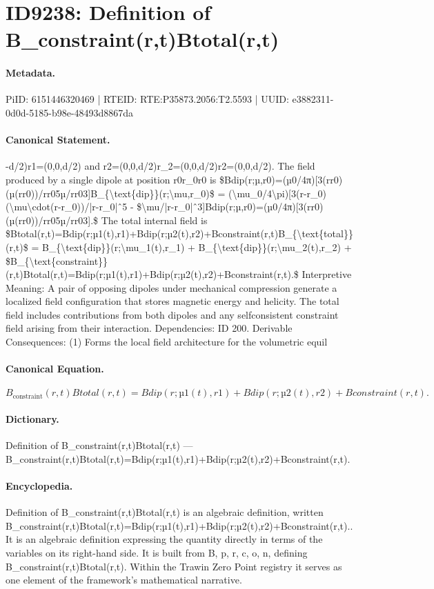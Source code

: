 \section*{ID9238: Definition of B\_constraint(r,t)Btotal(r,t)}
\paragraph{Metadata.}
PiID: 6151446320469 | RTEID: RTE:P35873.2056:T2.5593 | UUID: e3882311-0d0d-5185-b98e-48493d8867da

\paragraph{Canonical Statement.}
-d/2)r1=(0,0,d/2) and r2=(0,0,d/2)r\_2=(0,0,d/2)r2=(0,0,d/2). The field produced by a single dipole at position r0r\_0r0 is \$Bdip(r;µ,r0)=(µ0/4π)[3(rr0)(µ(rr0))/rr05µ/rr03]B\_\{\textbackslash{}text\{dip\}\}(r;\textbackslash{}mu,r\_0)\$ = (\textbackslash{}mu\_0/4\textbackslash{}pi)[3(r-r\_0)(\textbackslash{}mu\textbackslash{}cdot(r-r\_0))/|r-r\_0|ˆ5 - \$\textbackslash{}mu/|r-r\_0|ˆ3]Bdip(r;µ,r0)=(µ0/4π)[3(rr0)(µ(rr0))/rr05µ/rr03].\$ The total internal field is \$Btotal(r,t)=Bdip(r;µ1(t),r1)+Bdip(r;µ2(t),r2)+Bconstraint(r,t)B\_\{\textbackslash{}text\{total\}\}(r,t)\$ = B\_\{\textbackslash{}text\{dip\}\}(r;\textbackslash{}mu\_1(t),r\_1) + B\_\{\textbackslash{}text\{dip\}\}(r;\textbackslash{}mu\_2(t),r\_2) + \$B\_\{\textbackslash{}text\{constraint\}\}(r,t)Btotal(r,t)=Bdip(r;µ1(t),r1)+Bdip(r;µ2(t),r2)+Bconstraint(r,t).\$ Interpretive Meaning: A pair of opposing dipoles under mechanical compression generate a localized field configuration that stores magnetic energy and helicity. The total field includes contributions from both dipoles and any selfconsistent constraint field arising from their interaction. Dependencies: ID 200. Derivable Consequences: (1) Forms the local field architecture for the volumetric equil

\paragraph{Canonical Equation.}
\[
B_{\text{constraint}}(r,t)Btotal(r,t)=Bdip(r;µ1(t),r1)+Bdip(r;µ2(t),r2)+Bconstraint(r,t).
\]

\paragraph{Dictionary.}
Definition of B\_constraint(r,t)Btotal(r,t) — B\_constraint(r,t)Btotal(r,t)=Bdip(r;µ1(t),r1)+Bdip(r;µ2(t),r2)+Bconstraint(r,t).

\paragraph{Encyclopedia.}
Definition of B\_constraint(r,t)Btotal(r,t) is an algebraic definition, written B\_constraint(r,t)Btotal(r,t)=Bdip(r;µ1(t),r1)+Bdip(r;µ2(t),r2)+Bconstraint(r,t).. It is an algebraic definition expressing the quantity directly in terms of the variables on its right-hand side. It is built from B, p, r, c, o, n, defining B\_constraint(r,t)Btotal(r,t). Within the Trawin Zero Point registry it serves as one element of the framework's mathematical narrative.

